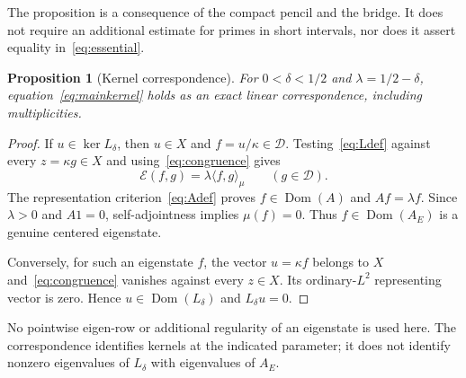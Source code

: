 \documentclass[11pt,a4paper]{article}
\numberwithin{equation}{section}
\newtheorem{proposition}[theorem]{Proposition}
\theoremstyle{definition}
\theoremstyle{remark}
\newcommand{\E}{\mathcal E}
\newcommand{\D}{\mathcal D}
\newcommand{\dom}{\operatorname{Dom}}
\newcommand{\ip}[2]{\langle #1,#2\rangle}
\begin{document}
The proposition is a consequence of the compact pencil and the bridge. It does not require an additional estimate for primes in short intervals, nor does it assert equality in~\eqref{eq:essential}.

\begin{proposition}[Kernel correspondence]\label{prop:kernel}
For $0<\delta<1/2$ and $\lambda=1/2-\delta$, equation~\eqref{eq:mainkernel} holds as an exact linear correspondence, including multiplicities.
\end{proposition}
\begin{proof}
If $u\in\ker L_\delta$, then $u\in X$ and $f=u/\kappa\in\D$. Testing~\eqref{eq:Ldef} against every $z=\kappa g\in X$ and using~\eqref{eq:congruence} gives
\[
 \E(f,g)=\lambda\ip{f}{g}_\mu\qquad(g\in\D).
\]
The representation criterion~\eqref{eq:Adef} proves $f\in\dom(A)$ and $Af=\lambda f$. Since $\lambda>0$ and $A1=0$, self-adjointness implies $\mu(f)=0$. Thus $f\in\dom(A_E)$ is a genuine centered eigenstate.

Conversely, for such an eigenstate $f$, the vector $u=\kappa f$ belongs to $X$ and~\eqref{eq:congruence} vanishes against every $z\in X$. Its ordinary-$L^2$ representing vector is zero. Hence $u\in\dom(L_\delta)$ and $L_\delta u=0$.
\end{proof}

No pointwise eigen-row or additional regularity of an eigenstate is used here. The correspondence identifies kernels at the indicated parameter; it does not identify nonzero eigenvalues of $L_\delta$ with eigenvalues of $A_E$.
\end{document}
